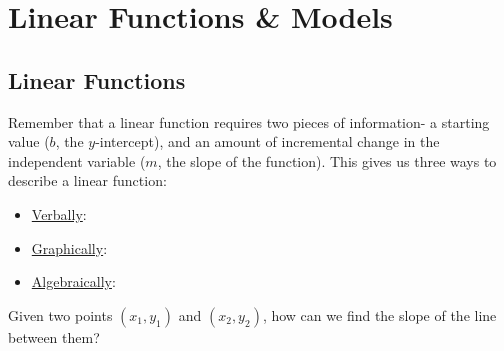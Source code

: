 \documentclass[notes]{subfiles}
\begin{document}
	\fancyhead[LO,RE]{\bfseries \currentname}
	\fancyfoot[C]{{}}
	\fancyfoot[RO,LE]{\large \thepage}	%



\section*{Linear Functions \& Models}\label{cs14}
	\subsection*{Linear Functions}
		Remember that a linear function requires two pieces of information- a starting value ($b$, the $y$-intercept), and an amount of incremental change in the independent variable ($m$, the slope of the function).  This gives us three ways to describe a linear function:\\[10pt]
		\begin{itemize}
			\item \underline{Verbally}: 
			\item \underline{Graphically}: 
			\item \underline{Algebraically}:  
		\end{itemize}
		\begin{question}
			Given two points $(x_1,y_1)$ and $(x_2,y_2)$, how can we find the slope of the line between them?
		\end{question}
\end{document}
